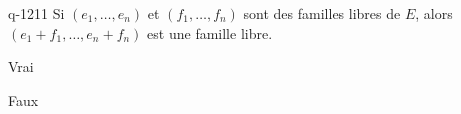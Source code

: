 \begin{truefalse}{q-1211}
Si $(e_1,\ldots,e_n)$ et $(f_1,\ldots,f_n)$ sont des familles libres de $E$, alors $(e_1+f_1,\ldots,e_n+f_n)$ est une famille libre.
\item Vrai
\item* Faux
\end{truefalse}

